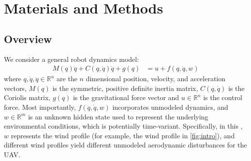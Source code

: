 %
%

\section{Materials and Methods}
\label{sec:methods} 

\subsection*{Overview}
We consider a general robot dynamics model:
\begin{equation}
    \label{eq:open-loop-dynamics}
    \begin{aligned}
    M(q)\ddot q + C(q,\dot q) \dot q + g(q) &= u + f(q, \dot{q}, w) 
    \end{aligned}
\end{equation}
where $q, \dot q, \ddot q \in \mathbb{R}^n$ are the $n$ dimensional position, velocity, and acceleration vectors, $M(q)$ is the symmetric, positive definite inertia matrix, $C(q,\dot q)$ is the Coriolis matrix, $g(q)$ is the gravitational force vector and $u\in\mathbb{R}^n$ is the control force. Most importantly, $f(q,\dot q, w)$ incorporates unmodeled dynamics, and $w \in \mathbb{R}^m$ is an unknown hidden state used to represent the underlying environmental conditions, which is potentially time-variant. Specifically, in this , $w$ represents the wind profile (for example, the wind profile in \cref{fig:intro}), and different wind profiles yield different unmodeled aerodynamic disturbances for the UAV.

